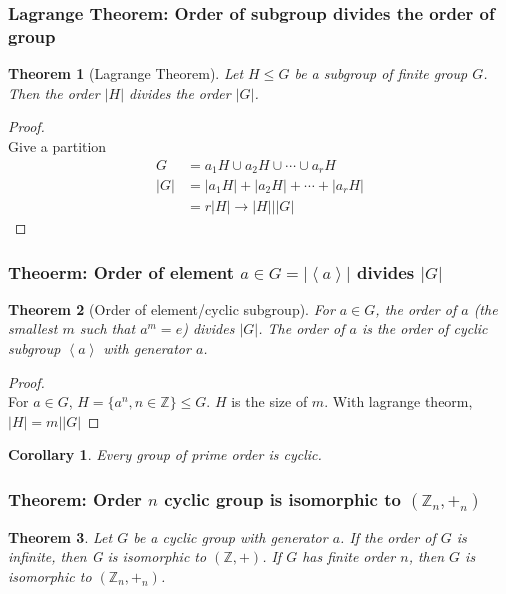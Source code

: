 \documentclass[11pt,a4paper]{article}
\newtheorem{theorem}{Theorem}
\newtheorem{corollary}{Corollary}
\begin{document}
\subsubsection{Lagrange Theorem: Order of subgroup divides the order of group}
\begin{theorem}[Lagrange Theorem]
    Let $H\leq G$ be a subgroup of finite group $G$. Then the order $|H|$ divides the order $|G|$.
\end{theorem}
\begin{proof}
\quad\\
Give a partition
\begin{equation}
    \begin{aligned}
        G&=a_1H\cup a_2H\cup \cdots \cup a_rH\\
        |G|&=|a_1H|+ |a_2H|+ \cdots + |a_rH|\\
        &=r|H|\rightarrow |H|\bigg||G|
    \end{aligned}
    \nonumber
\end{equation}
\end{proof}

\subsubsection{Theoerm: Order of element $a\in G =|\left\langle a\right\rangle|$ divides $|G|$}
\begin{theorem}[Order of element/cyclic subgroup]
For $a\in G$, the order of $a$ (the smallest $m$ such that $a^m=e$) divides $|G|$. The order of $a$ is the order of cyclic subgroup $\left\langle a\right\rangle$ with generator $a$.
\end{theorem}

\begin{proof}
\quad\\
For $a\in G$, $H=\{a^n,n\in \mathbb{Z}\}\leq G$. $H$ is the size of $m$. With lagrange theorm, $|H|=m\bigg||G|$
\end{proof}

\begin{corollary}
Every group of prime order is cyclic.
\end{corollary}

\subsubsection{Theorem: Order $n$ cyclic group is isomorphic to $(\mathbb{Z}_n,+_n)$}
\begin{theorem}
    Let $G$ be a cyclic group with generator $a$. If the order of $G$ is infinite, then G is isomorphic to $(\mathbb{Z},+)$. If $G$ has finite order $n$, then $G$ is isomorphic to $(\mathbb{Z}_n,+_n)$.
\end{theorem}
\end{document}
